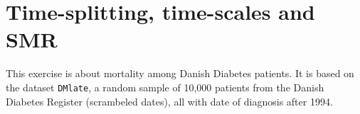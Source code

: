 



\renewcommand{\rwpre}{./graph/DMDK}

\section{Time-splitting, time-scales and SMR}

This exercise is about mortality among Danish Diabetes patients. It is
based on the dataset \texttt{DMlate}, a random sample of 10,000
patients from the Danish Diabetes Register (scrambeled dates), all
with date of diagnosis after 1994.

